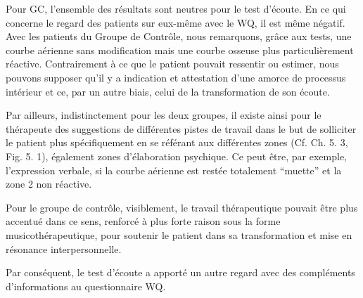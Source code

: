                 Pour GC, l'ensemble des résultats sont neutres pour le
                test d'écoute. En ce qui concerne le
                regard des patients sur eux-même avec le WQ, il est
                même négatif. Avec les patients du Groupe de
              Contrôle, nous remarquons, grâce aux tests, une courbe aérienne
              sans modification mais une courbe osseuse plus
              particulièrement réactive. Contrairement à
              ce que le patient pouvait ressentir ou estimer, nous pouvons supposer qu'il y a indication  et attestation d'une amorce de
              processus intérieur et ce, par un autre biais, celui de
              la transformation de son
              écoute.

 Par ailleurs, indistinctement pour les deux
 groupes, il existe ainsi pour le thérapeute des
 suggestions de différentes pistes de travail dans le but de
 solliciter le patient plus spécifiquement en se référant aux
              différentes zones (Cf. Ch. 5. 3, Fig. 5. 1), également zones
 d'élaboration psychique. Ce peut être, par exemple,
              l'expression verbale, si la courbe aérienne est restée
              totalement ``muette'' et la zone 2 non
              réactive.

              Pour le groupe de contrôle, visiblement, le travail
                thérapeutique pouvait être plus accentué dans ce
                sens, renforcé à plus forte raison sous la forme musicothérapeutique, pour soutenir le
                patient dans sa transformation et mise en résonance
                interpersonnelle.


                Par conséquent,  le test d'écoute a
                apporté un autre regard avec des compléments d'informations au questionnaire
                WQ.

